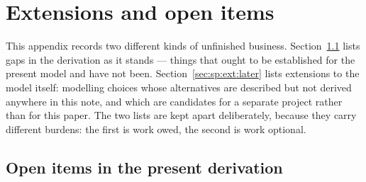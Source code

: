 ﻿\section{Extensions and open items}\label{sec:sp:extensions}

This appendix records two different kinds of unfinished business. Section~\ref{sec:sp:ext:open} lists
gaps in the derivation as it stands --- things that ought to be established for the present model and
have not been. Section~\ref{sec:sp:ext:later} lists extensions to the model itself: modelling choices
whose alternatives are described but not derived anywhere in this note, and which are candidates for a
separate project rather than for this paper. The two lists are kept apart deliberately, because they
carry different burdens: the first is work owed, the second is work optional.


\subsection{Open items in the present derivation}\label{sec:sp:ext:open}

